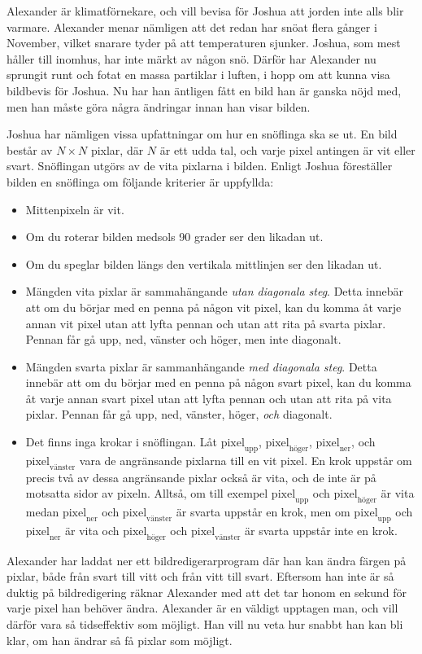 
Alexander är klimatförnekare, och vill bevisa för Joshua att jorden inte alls blir varmare. 
Alexander menar nämligen att det redan har snöat flera gånger i November, 
vilket snarare tyder på att temperaturen sjunker. Joshua, som mest håller till inomhus, 
har inte märkt av någon snö. 
Därför har Alexander nu sprungit runt och fotat en massa partiklar i luften, 
i hopp om att kunna visa bildbevis för Joshua. 
Nu har han äntligen fått en bild han är ganska nöjd med, 
men han måste göra några ändringar innan han visar bilden. 

Joshua har nämligen vissa upfattningar om hur en snöflinga ska se ut.
En bild består av $N \times N$ pixlar, där $N$ är ett udda tal, och varje pixel antingen är vit eller svart.
Snöflingan utgörs av de vita pixlarna i bilden.
Enligt Joshua föreställer bilden en snöflinga om följande kriterier är uppfyllda:

\begin{itemize}
  \item Mittenpixeln är vit.
  \item Om du roterar bilden medsols 90 grader ser den likadan ut.
  \item Om du speglar bilden längs den vertikala mittlinjen ser den likadan ut.
  \item Mängden vita pixlar är sammahängande \emph{utan diagonala steg}. 
    Detta innebär att om du börjar med en penna på någon vit pixel, kan 
    du komma åt varje annan vit pixel utan att lyfta pennan och utan
    att rita på svarta pixlar.
    Pennan får gå upp, ned, vänster och höger, men inte diagonalt.
  \item Mängden svarta pixlar är sammanhängande \emph{med diagonala steg}.
    Detta innebär att om du börjar med en penna på någon svart pixel, kan 
    du komma åt varje annan svart pixel utan att lyfta pennan och utan
    att rita på vita pixlar.
    Pennan får gå upp, ned, vänster, höger, \emph{och} diagonalt.
  \item Det finns inga krokar i snöflingan. 
  Låt $\text{pixel}_\text{upp}$, $\text{pixel}_\text{höger}$, $\text{pixel}_\text{ner}$, och $\text{pixel}_\text{vänster}$ vara de angränsande 
  pixlarna till en vit pixel. En krok uppstår om precis två av dessa angränsande pixlar också är vita, och de inte är på motsatta sidor av pixeln.
  Alltså, om till exempel $\text{pixel}_\text{upp}$ och $\text{pixel}_\text{höger}$ är vita medan $\text{pixel}_\text{ner}$ 
  och $\text{pixel}_\text{vänster}$ är svarta uppstår en krok, men om $\text{pixel}_\text{upp}$ och $\text{pixel}_\text{ner}$ är vita
  och $\text{pixel}_\text{höger}$ och $\text{pixel}_\text{vänster}$ är svarta uppstår inte en krok.
      
\end{itemize}
Alexander har laddat ner ett bildredigerarprogram där han kan ändra färgen på pixlar, både från svart till vitt och från vitt till svart. 
Eftersom han inte är så duktig på bildredigering räknar Alexander med att det tar honom en sekund för varje pixel han behöver ändra.
Alexander är en väldigt upptagen man, och vill därför vara så tidseffektiv som möjligt.
Han vill nu veta hur snabbt han kan bli klar, om han ändrar så få pixlar som möjligt. 


